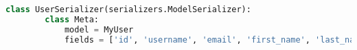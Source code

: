 \begin{lstlisting}[language=Python,caption={Django User serialization class},breaklines=true,label={lst:djangoSerialization}]
    class UserSerializer(serializers.ModelSerializer):
        class Meta:
            model = MyUser
            fields = ['id', 'username', 'email', 'first_name', 'last_name', 'password']
\end{lstlisting}
